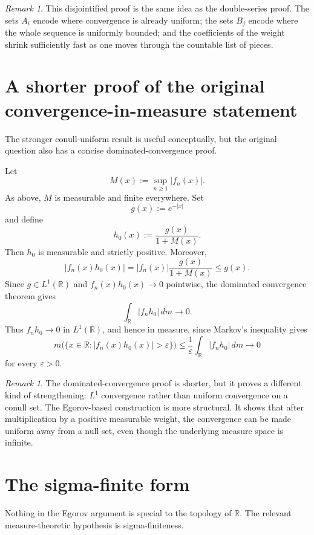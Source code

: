 \documentclass[11pt]{article}
\newcommand{\R}{\mathbb{R}}
\newcommand{\eps}{\varepsilon}
\theoremstyle{plain}
\theoremstyle{definition}
\theoremstyle{remark}
\newtheorem{remark}[theorem]{Remark}
\begin{document}
\begin{remark}
This disjointified proof is the same idea as the double-series proof.  The
sets $A_i$ encode where convergence is already uniform; the sets $B_j$ encode
where the whole sequence is uniformly bounded; and the coefficients of the
weight shrink sufficiently fast as one moves through the countable list of
pieces.
\end{remark}

\section{A shorter proof of the original convergence-in-measure statement}

The stronger conull-uniform result is useful conceptually, but the original
question also has a concise dominated-convergence proof.

Let
\[
        M(x):=\sup_{n\geq 1}|f_n(x)|.
\]
As above, $M$ is measurable and finite everywhere.  Set
\[
        g(x):=e^{-|x|}
\]
and define
\[
        h_0(x):=\frac{g(x)}{1+M(x)}.
\]
Then $h_0$ is measurable and strictly positive.  Moreover,
\[
        |f_n(x)h_0(x)|
        =|f_n(x)|\frac{g(x)}{1+M(x)}
        \leq g(x).
\]
Since $g\in L^1(\R)$ and $f_n(x)h_0(x)\to 0$ pointwise, the dominated
convergence theorem gives
\[
        \int_{\R}|f_nh_0|\,dm\longrightarrow 0.
\]
Thus $f_nh_0\to 0$ in $L^1(\R)$, and hence in measure, since Markov's
inequality gives
\[
        m\bigl(\{x\in\R:|f_n(x)h_0(x)|>\eps\}\bigr)
        \leq
        \frac{1}{\eps}\int_{\R}|f_nh_0|\,dm
        \longrightarrow 0
\]
for every $\eps>0$.

\begin{remark}
The dominated-convergence proof is shorter, but it proves a different kind of
strengthening: $L^1$ convergence rather than uniform convergence on a conull
set.  The Egorov-based construction is more structural.  It shows that after
multiplication by a positive measurable weight, the convergence can be made
uniform away from a null set, even though the underlying measure space is
infinite.
\end{remark}

\section{The sigma-finite form}

Nothing in the Egorov argument is special to the topology of $\R$.  The
relevant measure-theoretic hypothesis is sigma-finiteness.
\end{document}
